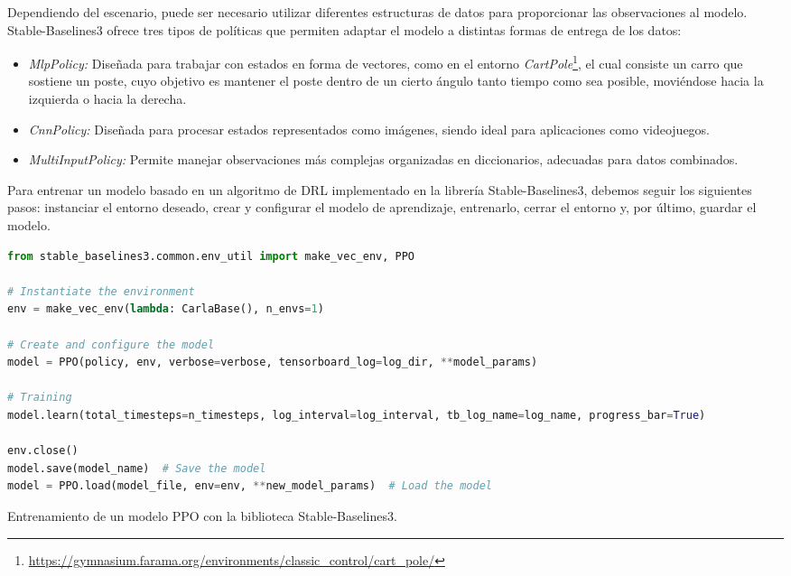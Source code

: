 Dependiendo del escenario, puede ser necesario utilizar diferentes estructuras de datos para proporcionar las observaciones al modelo. Stable-Baselines3 ofrece tres tipos de políticas que permiten adaptar el modelo a distintas formas de entrega de los datos:

\begin{itemize} 
\item \textit{MlpPolicy:} Diseñada para trabajar con estados en forma de vectores, como en el entorno \textit{CartPole}\footnote{\url{https://gymnasium.farama.org/environments/classic_control/cart_pole/}}, el cual consiste un carro que sostiene un poste, cuyo objetivo es mantener el poste dentro de un cierto ángulo tanto tiempo como sea posible, moviéndose hacia la izquierda o hacia la derecha. 
\item \textit{CnnPolicy:} Diseñada para procesar estados representados como imágenes, siendo ideal para aplicaciones como videojuegos.
\item \textit{MultiInputPolicy:} Permite manejar observaciones más complejas organizadas en diccionarios, adecuadas para datos combinados. 
\end{itemize}

Para entrenar un modelo basado en un algoritmo de \ac{DRL} implementado en la librería Stable-Baselines3, debemos seguir los siguientes pasos: instanciar el entorno deseado, crear y configurar el modelo de aprendizaje, entrenarlo, cerrar el entorno y, por último, guardar el modelo.
\begin{code}[h] \begin{lstlisting}[language=Python] 
from stable_baselines3.common.env_util import make_vec_env, PPO

# Instantiate the environment
env = make_vec_env(lambda: CarlaBase(), n_envs=1)

# Create and configure the model
model = PPO(policy, env, verbose=verbose, tensorboard_log=log_dir, **model_params)

# Training
model.learn(total_timesteps=n_timesteps, log_interval=log_interval, tb_log_name=log_name, progress_bar=True)

env.close()
model.save(model_name)  # Save the model
model = PPO.load(model_file, env=env, **new_model_params)  # Load the model
\end{lstlisting}
\caption[Ejemplo de código con Stable-Baselines3]{Entrenamiento de un modelo \ac{PPO} con la biblioteca Stable-Baselines3.} 
\label{cod:sb3} \end{code} 

